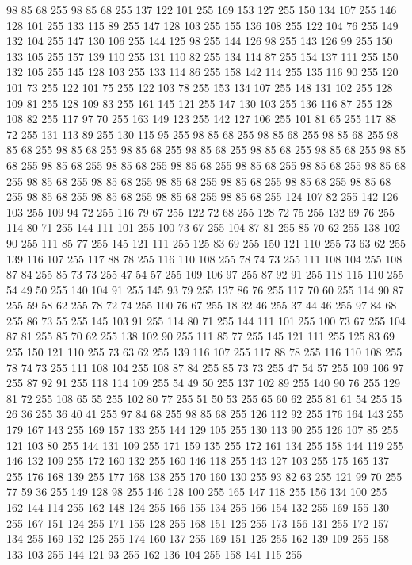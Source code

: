 98 85 68 255 98 85 68 255 137 122 101 255 169 153 127 255 150 134 107 255 146 128 101 255 133 115 89 255 147 128 103 255 155 136 108 255 122 104 76 255 149 132 104 255 147 130 106 255 144 125 98 255 144 126 98 255 143 126 99 255 150 133 105 255 157 139 110 255 131 110 82 255 134 114 87 255 154 137 111 255 150 132 105 255 145 128 103 255 133 114 86 255 158 142 114 255 135 116 90 255 120 101 73 255 122 101 75 255 122 103 78 255 153 134 107 255 148 131 102 255 128 109 81 255 128 109 83 255 161 145 121 255 147 130 103 255 136 116 87 255 128 108 82 255 117 97 70 255 163 149 123 255 142 127 106 255 101 81 65 255 117 88 72 255 131 113 89 255 130 115 95 255 98 85 68 255 98 85 68 255 98 85 68 255 98 85 68 255 98 85 68 255 98 85 68 255 98 85 68 255 98 85 68 255 98 85 68 255 98 85 68 255 98 85 68 255 98 85 68 255 98 85 68 255 98 85 68 255 98 85 68 255 98 85 68 255 98 85 68 255 98 85 68 255 98 85 68 255 98 85 68 255 98 85 68 255
98 85 68 255 98 85 68 255 98 85 68 255 98 85 68 255 98 85 68 255 124 107 82 255 142 126 103 255 109 94 72 255 116 79 67 255 122 72 68 255 128 72 75 255 132 69 76 255 114 80 71 255 144 111 101 255 100 73 67 255 104 87 81 255 85 70 62 255 138 102 90 255 111 85 77 255 145 121 111 255 125 83 69 255 150 121 110 255 73 63 62 255 139 116 107 255 117 88 78 255 116 110 108 255 78 74 73 255 111 108 104 255 108 87 84 255 85 73 73 255 47 54 57 255 109 106 97 255 87 92 91 255 118 115 110 255 54 49 50 255 140 104 91 255 145 93 79 255 137 86 76 255 117 70 60 255 114 90 87 255 59 58 62 255 78 72 74 255 100 76 67 255 18 32 46 255 37 44 46 255 97 84 68 255 86 73 55 255 145 103 91 255 114 80 71 255 144 111 101 255 100 73 67 255 104 87 81 255 85 70 62 255 138 102 90 255 111 85 77 255 145 121 111 255 125 83 69 255 150 121 110 255 73 63 62 255 139 116 107 255 117 88 78 255 116 110 108 255 78 74 73 255 111 108 104 255
108 87 84 255 85 73 73 255 47 54 57 255 109 106 97 255 87 92 91 255 118 114 109 255 54 49 50 255 137 102 89 255 140 90 76 255 129 81 72 255 108 65 55 255 102 80 77 255 51 50 53 255 65 60 62 255 81 61 54 255 15 26 36 255 36 40 41 255 97 84 68 255 98 85 68 255 126 112 92 255 176 164 143 255 179 167 143 255 169 157 133 255 144 129 105 255 130 113 90 255 126 107 85 255 121 103 80 255 144 131 109 255 171 159 135 255 172 161 134 255 158 144 119 255 146 132 109 255 172 160 132 255 160 146 118 255 143 127 103 255 175 165 137 255 176 168 139 255 177 168 138 255 170 160 130 255 93 82 63 255 121 99 70 255 77 59 36 255 149 128 98 255 146 128 100 255 165 147 118 255 156 134 100 255 162 144 114 255 162 148 124 255 166 155 134 255 166 154 132 255 169 155 130 255 167 151 124 255 171 155 128 255 168 151 125 255 173 156 131 255 172 157 134 255 169 152 125 255 174 160 137 255 169 151 125 255 162 139 109 255 158 133 103 255 144 121 93 255 162 136 104 255 158 141 115 255
